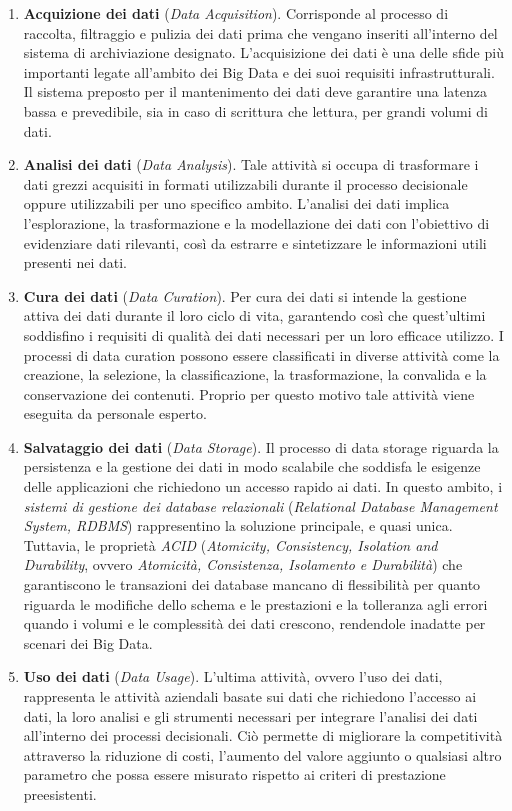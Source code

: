 \begin{enumerate}
    \item \textbf{Acquizione dei dati} (\textit{Data Acquisition}). Corrisponde al processo di raccolta, filtraggio e pulizia dei dati prima che vengano inseriti all’interno del sistema di archiviazione designato. L’acquisizione dei dati è una delle sfide più importanti legate all’ambito dei Big Data e dei suoi requisiti infrastrutturali. Il sistema preposto per il mantenimento dei dati deve garantire una latenza bassa e prevedibile, sia in caso di scrittura che lettura, per grandi volumi di dati.
    \item \textbf{Analisi dei dati} (\textit{Data Analysis}). Tale attività si occupa di trasformare i dati grezzi acquisiti in formati utilizzabili durante il processo decisionale oppure utilizzabili per uno specifico ambito. L’analisi dei dati implica l’esplorazione, la trasformazione e la modellazione dei dati con l’obiettivo di evidenziare dati rilevanti, così da estrarre e sintetizzare le informazioni utili presenti nei dati.
    \item \textbf{Cura dei dati} (\textit{Data Curation}). Per cura dei dati si intende la gestione attiva dei dati durante il loro ciclo di vita, garantendo così che quest’ultimi soddisfino i requisiti di qualità dei dati necessari per un loro efficace utilizzo.  I processi di data curation possono essere classificati in diverse attività come la creazione, la selezione, la classificazione, la trasformazione, la convalida e la conservazione dei contenuti. Proprio per questo motivo tale attività viene eseguita da personale esperto.
    \item \textbf{Salvataggio dei dati} (\textit{Data Storage}). Il processo di data storage riguarda la persistenza e la gestione dei dati in modo scalabile che soddisfa le esigenze delle applicazioni che richiedono un accesso rapido ai dati. In questo ambito, i \textit{sistemi di gestione dei database relazionali} (\textit{Relational Database Management System, RDBMS}) rappresentino la soluzione principale, e quasi unica. Tuttavia, le proprietà \textit{ACID} (\textit{Atomicity, Consistency, Isolation and Durability}, ovvero \textit{Atomicità, Consistenza, Isolamento e Durabilità}) che garantiscono le transazioni dei database mancano di flessibilità per quanto riguarda le modifiche dello schema e le prestazioni e la tolleranza agli errori quando i volumi e le complessità dei dati crescono, rendendole inadatte per scenari dei Big Data.
    \item \textbf{Uso dei dati} (\textit{Data Usage}). L’ultima attività, ovvero l’uso dei dati, rappresenta le attività aziendali basate sui dati che richiedono l’accesso ai dati, la loro analisi e gli strumenti necessari per integrare l’analisi dei dati all’interno dei processi decisionali. Ciò permette di migliorare la competitività attraverso la riduzione di costi, l’aumento del valore aggiunto o qualsiasi altro parametro che possa essere misurato rispetto ai criteri di prestazione preesistenti.
\end{enumerate}

